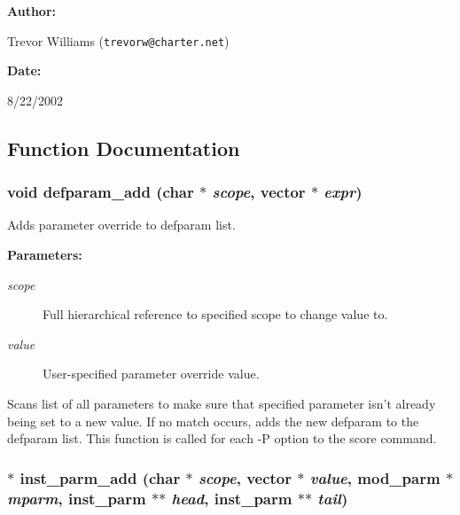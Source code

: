 \begin{Desc}
\item[{\bf Author: }]\par
Trevor Williams ({\tt trevorw@charter.net}) \end{Desc}
\begin{Desc}
\item[{\bf Date: }]\par
8/22/2002

\end{Desc}


\subsection{Function Documentation}
\subsubsection{\setlength{\rightskip}{0pt plus 5cm}void defparam\_\-add (char $\ast$ {\em scope}, {\bf vector} $\ast$ {\em expr})}\label{param_8h_a7}


Adds parameter override to defparam list.

\begin{Desc}
\item[{\bf Parameters: }]\par
\begin{description}
\item[
{\em scope}]Full hierarchical reference to specified scope to change value to. \item[
{\em value}]User-specified parameter override value.

\end{description}
\end{Desc}
Scans list of all parameters to make sure that specified parameter isn't already being set to a new value. If no match occurs, adds the new defparam to the defparam list. This function is called for each -P option to the score command. 
\subsubsection{$\ast$ inst\_\-parm\_\-add (char $\ast$ {\em scope}, {\bf vector} $\ast$ {\em value}, {\bf mod\_\-parm} $\ast$ {\em mparm}, {\bf inst\_\-parm} $\ast$$\ast$ {\em head}, {\bf inst\_\-parm} $\ast$$\ast$ {\em tail})}\label{param_8h_a6}


